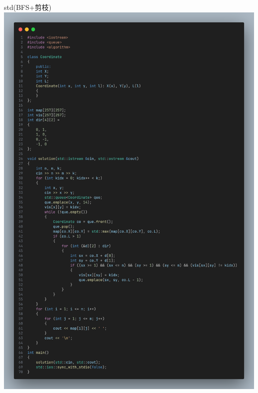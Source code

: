 \documentclass{beamer}
\begin{document}
    \begin{frame}{std(BFS+剪枝)}
        \centering\includegraphics[scale=0.08]{images/std/C.png}
    \end{frame}
\end{document}

